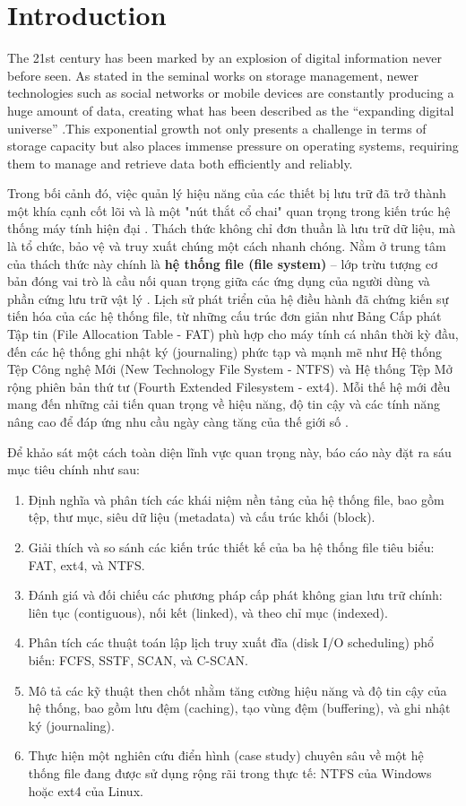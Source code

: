 \documentclass[12pt]{article}
\begin{document}
\section{Introduction}
The 21st century has been marked by an explosion of digital information never before seen. As stated in the seminal works on storage management, newer technologies such as social networks or mobile devices are constantly producing a huge amount of data, creating what has been described as the ``expanding digital universe'' \parencite{EMC2012InformationStorage}.This exponential growth not only presents a challenge in terms of storage capacity but also places immense pressure on operating systems, requiring them to manage and retrieve data both efficiently and reliably.

Trong bối cảnh đó, việc quản lý hiệu năng của các thiết bị lưu trữ đã trở thành một khía cạnh cốt lõi và là một "nút thắt cổ chai" quan trọng trong kiến trúc hệ thống máy tính hiện đại \parencite{Pokharel2021}. Thách thức không chỉ đơn thuần là lưu trữ dữ liệu, mà là tổ chức, bảo vệ và truy xuất chúng một cách nhanh chóng. Nằm ở trung tâm của thách thức này chính là \textbf{hệ thống file (file system)} – lớp trừu tượng cơ bản đóng vai trò là cầu nối quan trọng giữa các ứng dụng của người dùng và phần cứng lưu trữ vật lý \parencite{Silberschatz2018}. Lịch sử phát triển của hệ điều hành đã chứng kiến sự tiến hóa của các hệ thống file, từ những cấu trúc đơn giản như Bảng Cấp phát Tập tin (File Allocation Table - FAT) phù hợp cho máy tính cá nhân thời kỳ đầu, đến các hệ thống ghi nhật ký (journaling) phức tạp và mạnh mẽ như Hệ thống Tệp Công nghệ Mới (New Technology File System - NTFS) và Hệ thống Tệp Mở rộng phiên bản thứ tư (Fourth Extended Filesystem - ext4). Mỗi thế hệ mới đều mang đến những cải tiến quan trọng về hiệu năng, độ tin cậy và các tính năng nâng cao để đáp ứng nhu cầu ngày càng tăng của thế giới số \parencite{Tanenbaum2014}.

Để khảo sát một cách toàn diện lĩnh vực quan trọng này, báo cáo này đặt ra sáu mục tiêu chính như sau:
\begin{enumerate}
    \item Định nghĩa và phân tích các khái niệm nền tảng của hệ thống file, bao gồm tệp, thư mục, siêu dữ liệu (metadata) và cấu trúc khối (block).
    \item Giải thích và so sánh các kiến trúc thiết kế của ba hệ thống file tiêu biểu: FAT, ext4, và NTFS.
    \item Đánh giá và đối chiếu các phương pháp cấp phát không gian lưu trữ chính: liên tục (contiguous), nối kết (linked), và theo chỉ mục (indexed).
    \item Phân tích các thuật toán lập lịch truy xuất đĩa (disk I/O scheduling) phổ biến: FCFS, SSTF, SCAN, và C-SCAN.
    \item Mô tả các kỹ thuật then chốt nhằm tăng cường hiệu năng và độ tin cậy của hệ thống, bao gồm lưu đệm (caching), tạo vùng đệm (buffering), và ghi nhật ký (journaling).
    \item Thực hiện một nghiên cứu điển hình (case study) chuyên sâu về một hệ thống file đang được sử dụng rộng rãi trong thực tế: NTFS của Windows hoặc ext4 của Linux.
\end{enumerate}
\end{document}
